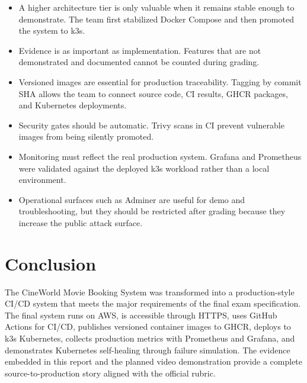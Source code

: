 \documentclass[12pt,a4paper]{report}
\begin{document}
\begin{itemize}[leftmargin=*]
  \item A higher architecture tier is only valuable when it remains stable enough to demonstrate. The team first stabilized Docker Compose and then promoted the system to k3s.
  \item Evidence is as important as implementation. Features that are not demonstrated and documented cannot be counted during grading.
  \item Versioned images are essential for production traceability. Tagging by commit SHA allows the team to connect source code, CI results, GHCR packages, and Kubernetes deployments.
  \item Security gates should be automatic. Trivy scans in CI prevent vulnerable images from being silently promoted.
  \item Monitoring must reflect the real production system. Grafana and Prometheus were validated against the deployed k3s workload rather than a local environment.
  \item Operational surfaces such as Adminer are useful for demo and troubleshooting, but they should be restricted after grading because they increase the public attack surface.
\end{itemize}

\section{Conclusion}
The CineWorld Movie Booking System was transformed into a production-style CI/CD system that meets the major requirements of the final exam specification. The final system runs on AWS, is accessible through HTTPS, uses GitHub Actions for CI/CD, publishes versioned container images to GHCR, deploys to k3s Kubernetes, collects production metrics with Prometheus and Grafana, and demonstrates Kubernetes self-healing through failure simulation. The evidence embedded in this report and the planned video demonstration provide a complete source-to-production story aligned with the official rubric.
\end{document}
